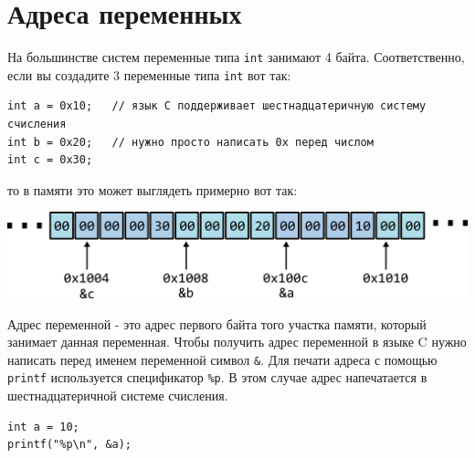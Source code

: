 \documentclass[10pt]{article}
\begin{document}
\section*{Адреса переменных}
На большинстве систем переменные типа \texttt{int} занимают 4 байта. Соответственно, если вы создадите 3 переменные типа \texttt{int} вот так:
\begin{lstlisting}
int a = 0x10;   // язык C поддерживает шестнадцатеричную систему счисления
int b = 0x20;   // нужно просто написать 0x перед числом
int c = 0x30;
\end{lstlisting}
то в памяти это может выглядеть примерно вот так:
\begin{center}
\includegraphics[scale=1]{../images/memory2.png}
\end{center}

Адрес переменной - это адрес первого байта того участка памяти, который занимает данная переменная.
Чтобы получить адрес переменной в языке C нужно написать перед именем переменной символ \texttt{\&}.
Для печати адреса с помощью \texttt{printf} используется спецификатор \texttt{\%p}. 
В этом случае адрес напечатается в шестнадцатеричной системе счисления.
\begin{lstlisting}
int a = 10;
printf("%p\n", &a);
\end{lstlisting}
\end{document}
